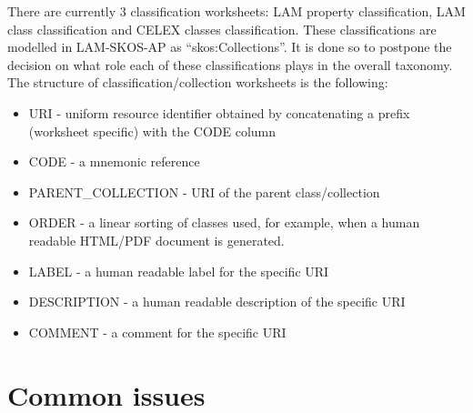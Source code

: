 There are currently 3 classification worksheets: LAM property classification, LAM class classification and CELEX classes classification. These classifications are modelled in LAM-SKOS-AP as ``skos:Collections''. It is done so to postpone the decision on what role each of these classifications plays in the overall taxonomy. The structure of classification/collection worksheets is the following:

\begin{itemize}
    \item URI - uniform resource identifier obtained by concatenating a prefix (worksheet specific) with the CODE column
    \item CODE - a mnemonic reference
    \item PARENT\_COLLECTION - URI of the parent class/collection
    \item ORDER - a linear sorting of classes used, for example, when a human readable HTML/PDF document is generated.
    \item LABEL - a human readable label for the specific URI
    \item DESCRIPTION - a human readable description of the specific URI
    \item COMMENT - a comment for the specific URI
\end{itemize}

\section{Common issues}
\label{sec:issues}

